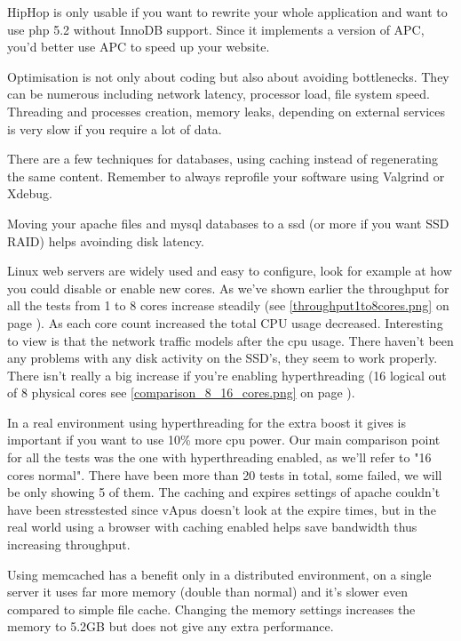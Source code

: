 HipHop is only usable if you want to rewrite your whole application and want to use \gls{php} 5.2 without InnoDB support. Since it implements a version of APC, you'd better use APC to speed up your website.

Optimisation is not only about coding but also about avoiding bottlenecks. They can be numerous including network latency, processor load, file system speed.
Threading and processes creation, memory leaks, depending on external services is very slow if you require a lot of data.

There are a few techniques for databases, using caching instead of regenerating the same content. 
Remember to always reprofile your software using Valgrind or Xdebug.

Moving your \gls{apache} files and \gls{mysql} databases to a \gls{ssd} (or more if you want SSD RAID) helps avoinding disk latency.

Linux web servers are widely used and easy to configure, look for example at how you could disable or enable new cores.
As we've shown earlier the throughput for all the tests from 1 to 8 cores increase steadily (see \autoref{throughput1to8cores.png} on page \pageref{throughput1to8cores.png}). 
As each core count increased the total CPU usage decreased. 
Interesting to view is that the network traffic models after the \gls{cpu} usage. There haven't been any problems with any disk activity on the SSD's, they seem to work properly.
There isn't really a big increase if you're enabling \gls{hyperthreading} (16 logical out of 8 physical cores see \autoref{comparison_8_16_cores.png} on page \pageref{comparison_8_16_cores.png}).

In a real environment using \gls{hyperthreading} for the extra boost it gives is important if you want to use 10\% more \gls{cpu} power. Our main comparison point for all the tests was the one with \gls{hyperthreading} enabled, as we'll refer to "16 cores normal". 
There have been more than 20 tests in total, some failed, we will be only showing 5 of them.
The caching and expires settings of \gls{apache} couldn't have been stresstested since vApus doesn't look at the expire times, but in the real world using a browser with caching enabled helps save bandwidth thus increasing throughput.

Using \gls{memcached} has a benefit only in a distributed environment, on a single server it uses far more memory (double than normal) and it's slower even compared to simple file cache. Changing the memory settings increases the memory to 5.2GB but does not give any extra performance.

